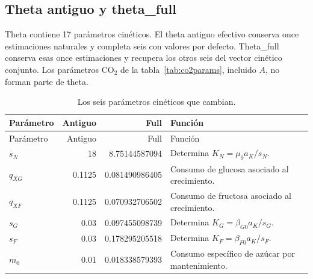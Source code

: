 \documentclass[11pt,a4paper]{article}
\begin{document}
\subsection{Theta antiguo y theta\_full}

Theta contiene 17 parámetros cinéticos. El theta antiguo efectivo conserva
once estimaciones naturales y completa seis con valores por defecto.
Theta\_full conserva esas once estimaciones y recupera los otros seis
del vector cinético conjunto. Los parámetros CO\(_2\) de la
tabla~\ref{tab:co2params}, incluido $A$, no forman parte de theta.

\begin{longtable}{@{}P{1.9cm}rrP{5.9cm}@{}}
\caption{Los seis parámetros cinéticos que cambian.}\label{tab:changedtheta}\\
\toprule Parámetro & Antiguo & Full & Función \\\midrule\endfirsthead
\toprule Parámetro & Antiguo & Full & Función \\\midrule\endhead
\bottomrule\endfoot
$s_N$ & 18 & 8.75144587094 & Determina $K_N=\mu_0a_K/s_N$.\\
$q_{XG}$ & 0.1125 & 0.081490986405 & Consumo de glucosa asociado al crecimiento.\\
$q_{XF}$ & 0.1125 & 0.070932706502 & Consumo de fructosa asociado al crecimiento.\\
$s_G$ & 0.03 & 0.097455098739 & Determina $K_G=\beta_{G0}a_K/s_G$.\\
$s_F$ & 0.03 & 0.178295205518 & Determina $K_F=\beta_{F0}a_K/s_F$.\\
$m_0$ & 0.01 & 0.018338579393 & Consumo específico de azúcar por mantenimiento.\\
\end{longtable}
\end{document}
